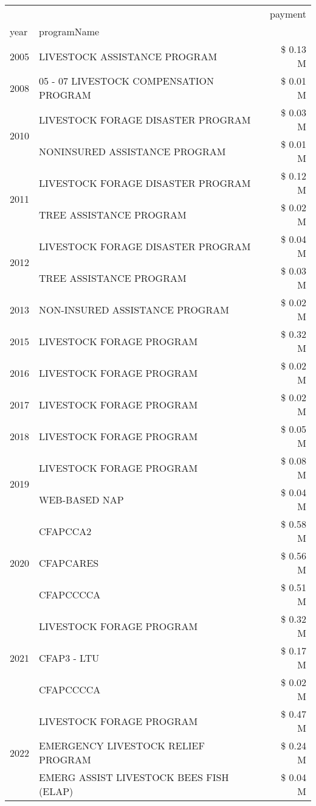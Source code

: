 \begin{tabular}{llr}
\toprule
 &  & payment \\
year & programName &  \\
\midrule
2005 & LIVESTOCK ASSISTANCE PROGRAM & \$ 0.13 M \\
\cline{1-3}
2008 & 05 - 07 LIVESTOCK COMPENSATION PROGRAM & \$ 0.01 M \\
\cline{1-3}
\multirow[t]{2}{*}{2010} & LIVESTOCK FORAGE DISASTER PROGRAM & \$ 0.03 M \\
 & NONINSURED ASSISTANCE PROGRAM & \$ 0.01 M \\
\cline{1-3}
\multirow[t]{2}{*}{2011} & LIVESTOCK FORAGE DISASTER PROGRAM & \$ 0.12 M \\
 & TREE ASSISTANCE PROGRAM & \$ 0.02 M \\
\cline{1-3}
\multirow[t]{2}{*}{2012} & LIVESTOCK FORAGE DISASTER PROGRAM & \$ 0.04 M \\
 & TREE ASSISTANCE PROGRAM & \$ 0.03 M \\
\cline{1-3}
2013 & NON-INSURED ASSISTANCE PROGRAM & \$ 0.02 M \\
\cline{1-3}
2015 & LIVESTOCK FORAGE PROGRAM & \$ 0.32 M \\
\cline{1-3}
2016 & LIVESTOCK FORAGE PROGRAM & \$ 0.02 M \\
\cline{1-3}
2017 & LIVESTOCK FORAGE PROGRAM & \$ 0.02 M \\
\cline{1-3}
2018 & LIVESTOCK FORAGE PROGRAM & \$ 0.05 M \\
\cline{1-3}
\multirow[t]{2}{*}{2019} & LIVESTOCK FORAGE PROGRAM & \$ 0.08 M \\
 & WEB-BASED NAP & \$ 0.04 M \\
\cline{1-3}
\multirow[t]{3}{*}{2020} & CFAPCCA2 & \$ 0.58 M \\
 & CFAPCARES & \$ 0.56 M \\
 & CFAPCCCCA & \$ 0.51 M \\
\cline{1-3}
\multirow[t]{3}{*}{2021} & LIVESTOCK FORAGE PROGRAM & \$ 0.32 M \\
 & CFAP3 - LTU & \$ 0.17 M \\
 & CFAPCCCCA & \$ 0.02 M \\
\cline{1-3}
\multirow[t]{3}{*}{2022} & LIVESTOCK FORAGE PROGRAM & \$ 0.47 M \\
 & EMERGENCY LIVESTOCK RELIEF PROGRAM & \$ 0.24 M \\
 & EMERG ASSIST LIVESTOCK BEES FISH (ELAP) & \$ 0.04 M \\
\cline{1-3}
\bottomrule
\end{tabular}
